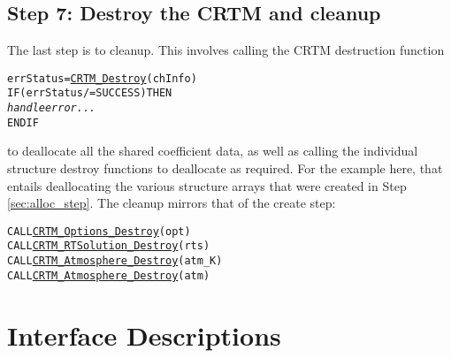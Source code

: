 \subsection{Step 7: Destroy the CRTM and cleanup}
\label{sec:destroy_step}
The last step is to cleanup. This involves calling the CRTM destruction function
\begin{alltt}
  errStatus = \hyperref[sec:CRTM_Destroy_interface]{CRTM_Destroy}( chInfo )
  IF ( errStatus /= SUCCESS ) THEN 
    \textrm{\textit{handle error...}}
  END IF\end{alltt}
to deallocate all the shared coefficient data, as well as calling the individual structure destroy functions to deallocate as required. For the example here, that entails deallocating the various structure arrays that were created in Step \ref{sec:alloc_step}. The cleanup mirrors that of the create step:
\begin{alltt}
  CALL \hyperref[sec:CRTM_Options_Destroy_interface]{CRTM_Options_Destroy}(opt)
  CALL \hyperref[sec:CRTM_RTSolution_Destroy_interface]{CRTM_RTSolution_Destroy}(rts)
  CALL \hyperref[sec:CRTM_Atmosphere_Destroy_interface]{CRTM_Atmosphere_Destroy}(atm_K)
  CALL \hyperref[sec:CRTM_Atmosphere_Destroy_interface]{CRTM_Atmosphere_Destroy}(atm)\end{alltt}


\section{Interface Descriptions}









